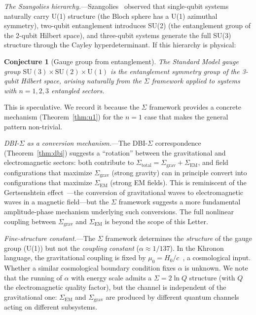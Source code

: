 \documentclass[prl,twocolumn,superscriptaddress,longbibliography]{revtex4-2}
\newtheorem*{conjecture}{Conjecture}
\newcommand{\Sgrav}{\Sigma_{\mathrm{grav}}}
\newcommand{\Sem}{\Sigma_{\mathrm{EM}}}
\newcommand{\Stot}{\Sigma_{\mathrm{total}}}
\begin{document}
\textit{The Szangolies hierarchy.}---Szangolies~\cite{Szangolies2025}
observed that single-qubit systems naturally carry U(1) structure
(the Bloch sphere has a U(1) azimuthal symmetry), two-qubit
entanglement introduces SU(2) (the entanglement group of the
2-qubit Hilbert space), and three-qubit systems generate the
full SU(3) structure through the Cayley hyperdeterminant.
If this hierarchy is physical:

\begin{conjecture}[Gauge group from entanglement]
The Standard Model gauge group
$\mathrm{SU}(3)\times\mathrm{SU}(2)\times\mathrm{U}(1)$
is the entanglement symmetry group of the 3-qubit Hilbert space,
arising naturally from the $\Sigma$ framework applied to
systems with $n = 1,2,3$ entangled sectors.
\end{conjecture}

This is speculative.
We record it because the $\Sigma$ framework provides a concrete
mechanism (Theorem~\ref{thm:u1}) for the $n = 1$ case that makes
the general pattern non-trivial.

\textit{DBI-$\Sigma$ as a conversion mechanism.}---The DBI-$\Sigma$
correspondence (Theorem~\ref{thm:dbi}) suggests a ``rotation''
between the gravitational and electromagnetic sectors: both
contribute to $\Stot = \Sgrav + \Sem$, and field configurations
that maximize $\Sgrav$ (strong gravity) can in principle convert
into configurations that maximize $\Sem$ (strong EM fields).
This is reminiscent of the Gertsenshtein
effect~\cite{Gertsenshtein1962}---the conversion of gravitational
waves to electromagnetic waves in a magnetic field---but the
$\Sigma$ framework suggests a more fundamental amplitude-phase
mechanism underlying such conversions.
The full nonlinear coupling between $\Sgrav$ and $\Sem$ is
beyond the scope of this Letter.

\textit{Fine-structure constant.}---The $\Sigma$ framework
determines the \emph{structure} of the gauge group (U(1)) but
not the \emph{coupling constant} ($\alpha \approx 1/137$).
In the Khronon language, the gravitational coupling is fixed
by $\mu_0 = H_0/c$~\cite{PaperIII}, a cosmological input.
Whether a similar cosmological boundary condition fixes
$\alpha$ is unknown.
We note that the running of $\alpha$ with energy scale admits a
$\Sigma = 2\ln Q$ structure (with $Q$ the electromagnetic
quality factor), but the channel is independent of the
gravitational one: $\Sem$ and $\Sgrav$ are produced by different
quantum channels acting on different subsystems.
\end{document}
